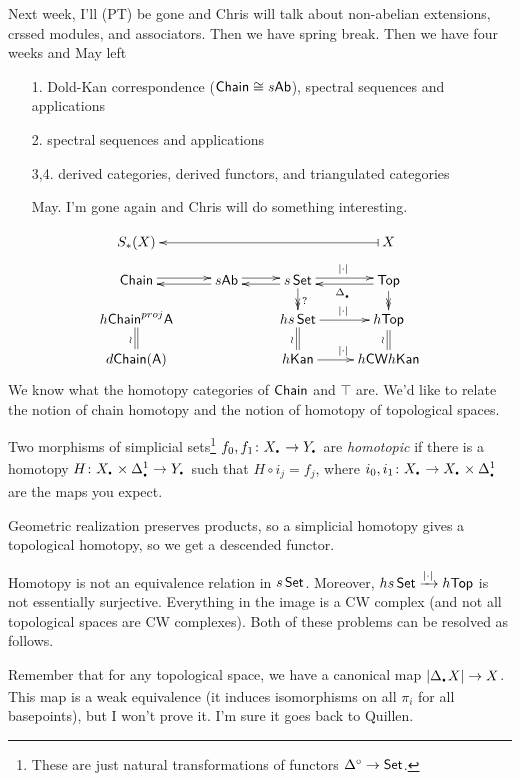 Next week, I'll (PT) be gone and Chris will talk about non-abelian extensions, crssed modules, and associators. Then we have spring break. Then we have four weeks and May left
\begin{enumerate}
 \item[1.] Dold-Kan correspondence ($\text{\sf Chain}\cong s\text{\sf Ab}$), spectral sequences and applications
 \item[2.] spectral sequences and applications
 \item[3,4.] derived categories, derived functors, and triangulated categories
 \item[May.] I'm gone again and Chris will do something interesting.
\end{enumerate}
\[\xymatrix@R-1pc{
 S_*(X) & & & X\ar@{|->}[lll] \\
 \chain \ar@<.5ex>[r]\ar@{<-}@<-.5ex>[r] & s\ab \ar@<.5ex>[r]\ar@{<-}@<-.5ex>[r] & s\set \ar@{->>}[d]^{?} \ar@<.5ex>[r]^{|\cdot|} \ar@{<-}@<-.5ex>[r]_{\Delta_\udot} & \top \ar@{->>}[d]\\
 h\chain^{proj}{\A} & & hs\set \ar[r]^{|\cdot|}& h\top \\
 d\chain(\A) \ar@{=}[u]^\wr & & h\kan\ar@{=}[u]^\wr \ar[r]^{|\cdot|} & h\cw h\kan\ar@{=}[u]^\wr
}\]
We know what the homotopy categories of $\text{\sf Chain}$ and $\top$ are. We'd like to relate the notion of chain homotopy and the notion of homotopy of topological spaces.
\begin{definition}
 Two morphisms of simplicial sets\footnote{These are just natural transformations of functors $\Delta^\circ\to \operatorname{\sf Set}$.} $f_0,f_1\colon X_\udot\to Y_\udot$ are \emph{homotopic} if there is a homotopy $H\colon X_\udot\times \Delta^1_\udot\to Y_\udot$ such that $H\circ i_j= f_j$, where $i_0,i_1\colon X_\udot\to X_\udot \times \Delta^1_\udot$ are the maps you expect.
\end{definition}
Geometric realization preserves products, so a simplicial homotopy gives a topological homotopy, so we get a descended functor.
\begin{warning}
 Homotopy is not an equivalence relation in $s\operatorname{\sf Set}$. Moreover, $hs\operatorname{\sf Set}\xrightarrow{|\cdot|}h\text{\sf Top}$ is not essentially surjective. Everything in the image is a CW complex (and not all topological spaces are CW complexes). Both of these problems can be resolved as follows.
\end{warning}
Remember that for any topological space, we have a canonical map $|\Delta_\udot X|\to X$. This map is a weak equivalence (it induces isomorphisms on all $\pi_i$ for all basepoints), but I won't prove it. I'm sure it goes back to Quillen.
